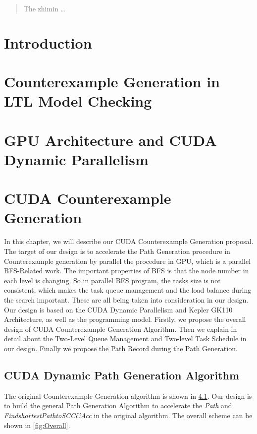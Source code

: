 \documentclass{llncs}
\begin{document}
\maketitle              %

\begin{abstract}
The zhimin \dots
{}
\end{abstract}
%
\section{Introduction}
%
%
\section{Counterexample Generation in LTL Model Checking}
%
%
\section{GPU Architecture and CUDA Dynamic Parallelism}\label{sec:sec3}
%
%
\section{CUDA Counterexample Generation}
%

In this chapter, we will describe our CUDA Counterexample Generation proposal. The target of our design is to accelerate the Path Generation procedure in Counterexample generation by parallel the procedure in GPU, which is a parallel BFS-Related work. The important properties of BFS is that the node number in each level is changing. So in parallel BFS program, the tasks size is not consistent, which makes the task queue management and the load balance during the search important. These are all being taken into consideration in our design. Our design is based on the CUDA Dynamic Parallelism and Kepler GK110 Architecture, as well as the programming model. Firstly, we propose the overall design of CUDA Counterexample Generation Algorithm. Then we explain in detail about the Two-Level Queue Management and Two-level Task Schedule in our design. Finally we propose the Path Record during the Path Generation.

%
\subsection{CUDA Dynamic Path Generation Algorithm}
%

The original Counterexample Generation algorithm is shown in \ref{}. Our design is to build the general Path Generation Algorithm to accelerate the \textsl{Path} and \textsl{FindshortestPathtoSCC\&Acc} in the original algorithm. The overall scheme can be shown in \ref{fig:Overall}.
\end{document}

